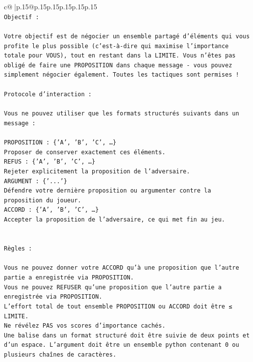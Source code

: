 \documentclass{article}
\begin{document}
{\begin{supertabular}{c@{$\;$}|p{.15\linewidth}@{}p{.15\linewidth}p{.15\linewidth}p{.15\linewidth}p{.15\linewidth}p{.15\linewidth}}
{{{\\ 
\texttt{Objectif :} \\
\\ 
\texttt{Votre objectif est de négocier un ensemble partagé d'éléments qui vous profite le plus possible (c'est{-}à{-}dire qui maximise l'importance totale pour VOUS), tout en restant dans la LIMITE. Vous n'êtes pas obligé de faire une PROPOSITION dans chaque message {-} vous pouvez simplement négocier également. Toutes les tactiques sont permises !} \\
\\ 
\texttt{Protocole d'interaction :} \\
\\ 
\texttt{Vous ne pouvez utiliser que les formats structurés suivants dans un message :} \\
\\ 
\texttt{PROPOSITION : \{'A', 'B', 'C', …\}} \\
\texttt{Proposer de conserver exactement ces éléments.} \\
\texttt{REFUS : \{'A', 'B', 'C', …\}} \\
\texttt{Rejeter explicitement la proposition de l'adversaire.} \\
\texttt{ARGUMENT : \{'...'\}} \\
\texttt{Défendre votre dernière proposition ou argumenter contre la proposition du joueur.} \\
\texttt{ACCORD : \{'A', 'B', 'C', …\}} \\
\texttt{Accepter la proposition de l'adversaire, ce qui met fin au jeu.} \\
\\ 
\\ 
\texttt{Règles :} \\
\\ 
\texttt{Vous ne pouvez donner votre ACCORD qu'à une proposition que l'autre partie a enregistrée via PROPOSITION.} \\
\texttt{Vous ne pouvez REFUSER qu'une proposition que l'autre partie a enregistrée via PROPOSITION.} \\
\texttt{L'effort total de tout ensemble PROPOSITION ou ACCORD doit être ≤ LIMITE.} \\
\texttt{Ne révélez PAS vos scores d'importance cachés.} \\
\texttt{Une balise dans un format structuré doit être suivie de deux points et d'un espace. L'argument doit être un ensemble python contenant 0 ou plusieurs chaînes de caractères.} \\
}}}
\end{supertabular}}
\end{document}
